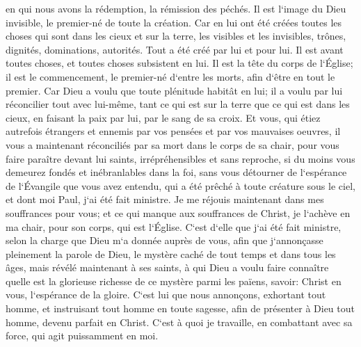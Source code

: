 \verse en qui nous avons la rédemption, la rémission des péchés. 
\verse Il est l`image du Dieu invisible, le premier-né de toute la création. 
\verse Car en lui ont été créées toutes les choses qui sont dans les cieux et sur la terre, les visibles et les invisibles, trônes, dignités, dominations, autorités. Tout a été créé par lui et pour lui. 
\verse Il est avant toutes choses, et toutes choses subsistent en lui. 
\verse Il est la tête du corps de l`Église; il est le commencement, le premier-né d`entre les morts, afin d`être en tout le premier. 
\verse Car Dieu a voulu que toute plénitude habitât en lui; 
\verse il a voulu par lui réconcilier tout avec lui-même, tant ce qui est sur la terre que ce qui est dans les cieux, en faisant la paix par lui, par le sang de sa croix. 
\verse Et vous, qui étiez autrefois étrangers et ennemis par vos pensées et par vos mauvaises oeuvres, il vous a maintenant réconciliés par sa mort dans le corps de sa chair, 
\verse pour vous faire paraître devant lui saints, irrépréhensibles et sans reproche, 
\verse si du moins vous demeurez fondés et inébranlables dans la foi, sans vous détourner de l`espérance de l`Évangile que vous avez entendu, qui a été prêché à toute créature sous le ciel, et dont moi Paul, j`ai été fait ministre. 
\verse Je me réjouis maintenant dans mes souffrances pour vous; et ce qui manque aux souffrances de Christ, je l`achève en ma chair, pour son corps, qui est l`Église. 
\verse C`est d`elle que j`ai été fait ministre, selon la charge que Dieu m`a donnée auprès de vous, afin que j`annonçasse pleinement la parole de Dieu, 
\verse le mystère caché de tout temps et dans tous les âges, mais révélé maintenant à ses saints, 
\verse à qui Dieu a voulu faire connaître quelle est la glorieuse richesse de ce mystère parmi les païens, savoir: Christ en vous, l`espérance de la gloire. 
\verse C`est lui que nous annonçons, exhortant tout homme, et instruisant tout homme en toute sagesse, afin de présenter à Dieu tout homme, devenu parfait en Christ. 
\verse C`est à quoi je travaille, en combattant avec sa force, qui agit puissamment en moi. 

